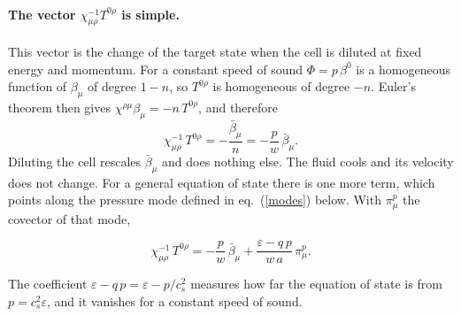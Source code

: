 \documentclass[11pt,aps,preprint,nofootinbib,superscriptaddress,tightenlines]{revtex4-2}
\def\st{\begin{equation}}
\def\stp{\end{equation}}
\def\Eq#1{eq.~(\ref{#1})}
\let\oldparagraph\paragraph
\renewcommand{\paragraph}{\par\bigskip\oldparagraph}
\begin{document}
\paragraph{The vector $\chi^{-1}_{\mu\rho}T^{0\rho}$ is simple.}  This vector is the change of the target state when the cell is diluted at fixed
energy and momentum.  For a constant speed of sound $\Phi=p\,\beta^0$ is a homogeneous function of $\beta_\mu$ of degree $1-n$, so $T^{0\rho}$ is
homogeneous of degree $-n$.  Euler's theorem then gives $\chi^{\rho\mu}\beta_\mu=-n\,T^{0\rho}$, and therefore
\st
\chi^{-1}_{\mu\rho}\,T^{0\rho}=-\frac{\bar\beta_\mu}n=-\frac pw\,\bar\beta_\mu .
\stp
Diluting the cell rescales $\bar\beta_\mu$ and does nothing else.  The fluid cools and its velocity does not change.  For a general equation of state
there is one more term, which points along the pressure mode defined in \Eq{modes} below.  With $\pi^p_\mu$ the covector of that mode,
\begin{keyeq}
\st
\chi^{-1}_{\mu\rho}\,T^{0\rho}=-\frac pw\,\bar\beta_\mu+\frac{\varepsilon-q\,p}{w\,a}\,\pi^p_\mu .
\label{chiinvT}
\stp
\end{keyeq}
The coefficient $\varepsilon-q\,p=\varepsilon-p/c_s^2$ measures how far the equation of state is from $p=c_s^2\varepsilon$, and it vanishes for a constant
speed of sound.
\end{document}
